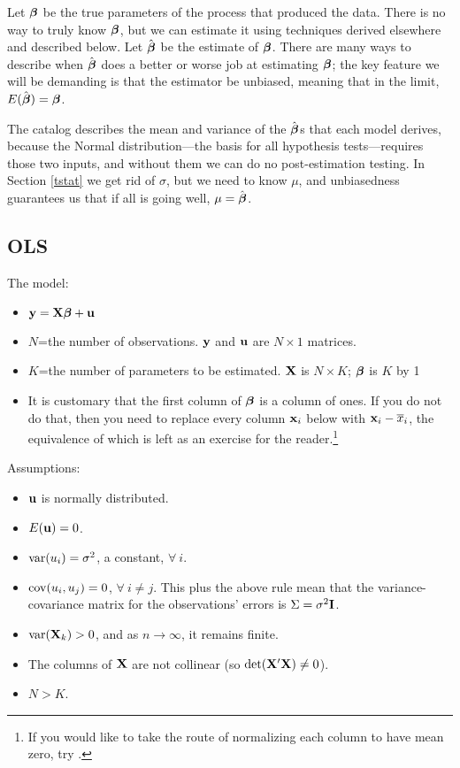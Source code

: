 Let ${\mbox{\boldmath$\beta$}}$ be the true parameters of the process that produced the
data. There is no way to truly know ${\mbox{\boldmath$\beta$}}$, but we can estimate it
using techniques derived elsewhere and described below. Let 
$\hat{{\mbox{\boldmath$\beta$}}}$ be the estimate of ${\mbox{\boldmath$\beta$}}$.  There are many ways to
describe when $\hat{{\mbox{\boldmath$\beta$}}}$ does a better or worse job at estimating 
${\mbox{\boldmath$\beta$}}$; the key feature we will be demanding is that the estimator be
unbiased, meaning that in the limit, $E(\hat{{\mbox{\boldmath$\beta$}}}) = {\mbox{\boldmath$\beta$}}$.

The catalog describes the mean and variance of the $\hat{{\mbox{\boldmath$\beta$}}}$s that
each model derives, because the Normal distribution---the basis for all
hypothesis tests---requires those two inputs,
and without them we can do no post-estimation testing.  
In Section \ref{tstat} we get rid of $\sigma$, but we
need to know $\mu$, and unbiasedness guarantees us that if all is going
well, $\mu =\hat{{\mbox{\boldmath$\beta$}}}$.

\subsection{OLS}
The model: 
\begin{itemize}
\item ${\bf y}={\bf X}{\mbox{\boldmath$\beta$}} + {\bf u}$
\item $N$=the number of observations. ${\bf y}$ and ${\bf u}$ are $N \times 1$
matrices.
\item $K$=the number of parameters to be estimated. ${\bf X}$ is $N \times K$;
${\mbox{\boldmath$\beta$}}$ is $K$ by 1
\item It is customary that the first column of ${\mbox{\boldmath$\beta$}}$ is a column of
ones. If you do not do that, then you need to replace every column ${\bf x}_i$ below
with ${\bf x}_i-\overline x_i$, the equivalence of which is left as an exercise
for the reader.\footnote{If you would like to take the route of
normalizing each column to have mean zero, try
.}
\end{itemize}

Assumptions:

\begin{itemize}
\item ${\bf u}$ is normally distributed.
\item $E({\bf u}) = 0$.
\item $\operatorname{var}(u_i) = \sigma^2$, a constant, $\forall\ i$.
\item $\operatorname{cov}(u_i, u_j) = 0$, $\forall\ i\neq j$. This plus the above rule
mean that the variance-covariance matrix for the observations' errors is
$\Sigma =
\sigma^2{\bf I}$.
\item $\operatorname{var}({\bf X}_k)>0$, and as $n\to\infty$, it remains finite.
\item The columns of ${\bf X}$ are not collinear (so $\det({\bf X}'{\bf X})\neq 0$).
\item $N>K$.
\end{itemize}

